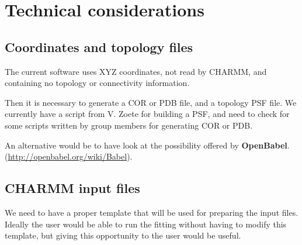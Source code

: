 \documentclass[12pt,a4paper]{article}
\begin{document}
\section{Technical considerations}

\subsection{Coordinates and topology files}
The current software uses XYZ coordinates, not read by CHARMM, and containing 
no topology or connectivity information.

\medskip

Then it is necessary to generate a COR or PDB file, and a topology PSF file. We 
currently have a script from V. Zoete for building a PSF, and need to check for 
some scripts written by group members for generating COR or PDB. 

\medskip

An alternative would be to have look at the possibility offered by 
\textbf{OpenBabel}.\\
(\href{http://openbabel.org/wiki/Babel}{http://openbabel.org/wiki/Babel}).

\subsection{CHARMM input files}
We need to have a proper template that will be used for preparing the input 
files. Ideally the user would be able to run the fitting without having to 
modify this template, but giving this opportunity to the user would be useful.
\end{document}
